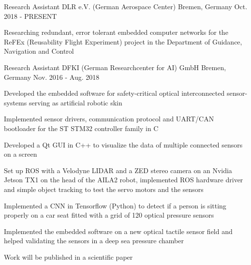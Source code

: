

\begin{cventries}

  \cventry
    {Research Assistant} %
    {DLR e.V. (German Aerospace Center)} %
    {Bremen, Germany} %
    {Oct. 2018 - PRESENT} %
    {
      \begin{cvitems} %
        \item {Researching redundant, error tolerant embedded computer networks for the ReFEx (Reusability Flight Experiment) project in the Department of Guidance, Navigation and Control}
      \end{cvitems}
    }
    
  \cventry
    {Research Assistant} %
    {DFKI (German Researchcenter for AI) GmbH} %
    {Bremen, Germany} %
    {Nov. 2016 - Aug. 2018} %
    {
      \begin{cvitems} %
        \item {Developed the embedded software for safety-critical optical interconnected sensor-systems serving as artificial robotic skin}
        \item {Implemented sensor drivers, communication protocol and UART/CAN bootloader for the ST STM32 controller family in C}
        \item {Developed a Qt GUI in C++ to visualize the data of multiple connected sensors on a screen}
        \item {Set up ROS with a Velodyne LIDAR and a ZED stereo camera on an Nvidia Jetson TX1 on the head of the AILA2 robot, implemented ROS hardware driver and simple object tracking to test the servo motors and the sensors}
        \item {Implemented a CNN in Tensorflow (Python) to detect if a person is sitting properly on a car seat fitted with a grid of 120 optical pressure sensors}
        \item {Implemented the embedded software on a new optical tactile sensor field and helped validating the sensors in a deep sea pressure chamber}
        \item {Work will be published in a scientific paper}
      \end{cvitems}
    }


\end{cventries}
